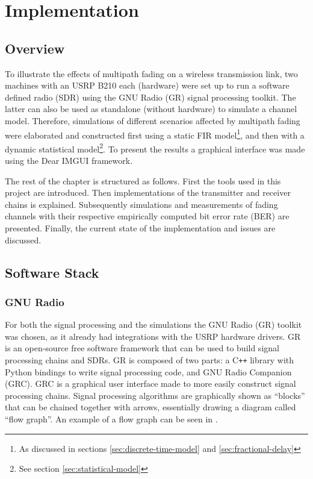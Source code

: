 
\chapter{Implementation} \label{chp:implementation}

\section{Overview}

To illustrate the effects of multipath fading on a wireless transmission link, two machines with an USRP B210 each (hardware) were set up to run a software defined radio (SDR) using the GNU Radio (GR) signal processing toolkit. The latter can also be used as standalone (without hardware) to simulate a channel model. Therefore, simulations of different scenarios affected by multipath fading were elaborated and constructed first using a static FIR model\footnote{As discussed in sections \ref{sec:discrete-time-model} and \ref{sec:fractional-delay}}, and then with a dynamic statistical model\footnote{See section \ref{sec:statistical-model}}. To present the results a graphical interface was made using the Dear IMGUI framework.

The rest of the chapter is structured as follows. First the tools used in this project are introduced. Then implementations of the transmitter and receiver chains is explained. Subsequently simulations and measurements of fading channels with their respective empirically computed bit error rate (BER) are presented. Finally, the current state of the implementation and issues are discussed.

\section{Software Stack}

\subsection{GNU Radio}

For both the signal processing and the simulations the GNU Radio (GR) toolkit was chosen, as it already had integrations with the USRP hardware drivers. GR is an open-source free software framework that can be used to build signal processing chains and SDRs. GR is composed of two parts: a C\texttt{++} library with Python bindings to write signal processing code, and GNU Radio Companion (GRC). GRC is a graphical user interface made to more easily construct signal processing chains. Signal processing algorithms are graphically shown as ``blocks'' that can be chained together with arrows, essentially drawing a diagram called ``flow graph''. An example of a flow graph can be seen in .

